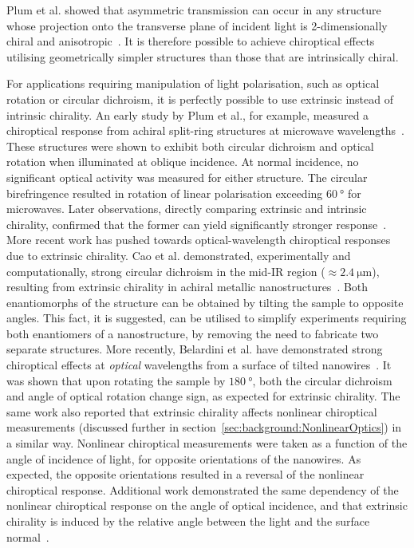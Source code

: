 Plum et al. showed that asymmetric transmission can occur in any structure whose projection onto the transverse plane of incident light is 2-dimensionally chiral and anisotropic~\cite{Plum2011}. It is therefore possible to achieve chiroptical effects utilising geometrically simpler structures than those that are intrinsically chiral.

For applications requiring manipulation of light polarisation, such as optical rotation or circular dichroism, it is perfectly possible to use extrinsic instead of intrinsic chirality. An early study by Plum et al., for example, measured a chiroptical response from achiral split-ring structures at microwave wavelengths~\cite{Plum2009c}. These structures were shown to exhibit both circular dichroism and optical rotation when illuminated at oblique incidence. At normal incidence, no significant optical activity was measured for either structure. The circular birefringence resulted in rotation of linear polarisation exceeding $\SI{60}{\degree}$ for microwaves. Later observations, directly comparing extrinsic and intrinsic chirality, confirmed that the former can yield significantly stronger response~\cite{Maoz2012a}. 
More recent work has pushed towards optical-wavelength chiroptical responses due to extrinsic chirality.
Cao et al. demonstrated, experimentally and computationally, strong circular dichroism in the mid-IR region ($\approx\SI{2.4}{\micro\m}$), resulting from extrinsic chirality in achiral metallic nanostructures~\cite{Cao2014}. Both enantiomorphs of the structure can be obtained by tilting the sample to opposite angles. This fact, it is suggested, can be utilised to simplify experiments requiring both enantiomers of a nanostructure, by removing the need to fabricate two separate structures.
More recently, Belardini et al. have demonstrated strong chiroptical effects at \textit{optical} wavelengths from a surface of tilted nanowires~\cite{Belardini2016}. It was shown that upon rotating the sample by $\SI{180}{\degree}$, both the circular dichroism and angle of optical rotation change sign, as expected for extrinsic chirality. 
The same work also reported that extrinsic chirality affects nonlinear chiroptical measurements (discussed further in section~\ref{sec:background:NonlinearOptics}) in a similar way. Nonlinear chiroptical measurements were taken as a function of the angle of incidence of light, for opposite orientations of the nanowires. As expected, the opposite orientations resulted in a reversal of the nonlinear chiroptical response. Additional work demonstrated the same dependency of the nonlinear chiroptical response on the angle of optical incidence, and that extrinsic chirality is induced by the relative angle between the light and the surface normal~\cite{Belardini2015}.


